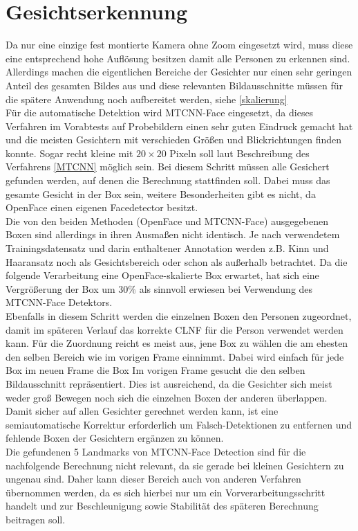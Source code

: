 \section{Gesichtserkennung}
\label{detection_Gesicht}
Da nur eine einzige fest montierte Kamera ohne Zoom eingesetzt wird, muss diese eine entsprechend hohe Auflösung besitzen damit alle Personen zu erkennen sind. Allerdings machen die eigentlichen Bereiche der Gesichter nur einen sehr geringen Anteil des gesamten Bildes aus und diese relevanten Bildausschnitte müssen für die spätere Anwendung noch aufbereitet werden, siehe \autoref{skalierung}\\
Für die automatische Detektion wird MTCNN-Face eingesetzt, da dieses Verfahren im Vorabtests auf Probebildern einen sehr guten Eindruck gemacht hat und die meisten Gesichtern mit verschieden Größen und Blickrichtungen finden konnte. Sogar recht kleine mit $20\times 20$ Pixeln soll laut Beschreibung des Verfahrens \autoref{MTCNN} möglich sein. Bei diesem Schritt müssen alle Gesichert gefunden werden, auf denen die Berechnung stattfinden soll. Dabei muss das gesamte Gesicht in der Box sein, weitere Besonderheiten gibt es nicht, da OpenFace einen eigenen Facedetector besitzt.\\
Die von den beiden Methoden (OpenFace und MTCNN-Face) ausgegebenen Boxen sind allerdings in ihren Ausmaßen nicht identisch. Je nach verwendetem Trainingsdatensatz und darin enthaltener Annotation werden z.B. Kinn und Haaransatz noch als Gesichtsbereich oder schon als außerhalb betrachtet. Da die folgende Verarbeitung eine OpenFace-skalierte Box erwartet, hat sich eine Vergrößerung der Box um $30\%$ als sinnvoll erwiesen bei Verwendung des MTCNN-Face Detektors.\\
Ebenfalls in diesem Schritt werden die einzelnen Boxen den Personen zugeordnet, damit im späteren Verlauf das korrekte CLNF für die Person verwendet werden kann. Für die Zuordnung reicht es meist aus, jene Box zu wählen die am ehesten den selben Bereich wie im vorigen Frame einnimmt. Dabei wird einfach für jede Box im neuen Frame die Box Im vorigen Frame gesucht die den selben Bildausschnitt repräsentiert. Dies ist ausreichend, da die Gesichter sich meist weder groß Bewegen noch sich die einzelnen Boxen der anderen überlappen.\\
Damit sicher auf allen Gesichter gerechnet werden kann, ist eine semiautomatische Korrektur erforderlich um Falsch-Detektionen zu entfernen und fehlende Boxen der Gesichtern ergänzen zu können.\\
Die gefundenen 5 Landmarks von MTCNN-Face Detection sind für die nachfolgende Berechnung nicht relevant, da sie gerade bei kleinen Gesichtern zu ungenau sind. Daher kann dieser Bereich auch von anderen Verfahren übernommen werden, da es sich hierbei nur um ein Vorverarbeitungsschritt handelt und zur Beschleunigung sowie Stabilität des späteren Berechnung beitragen soll.
